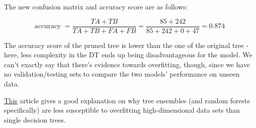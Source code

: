 \documentclass[12pt]{article}
\begin{document}
\begin{enumerate}[leftmargin=\labelsep]
        \begin{figure}[H]
          \centering
          
        \end{figure}

        The new confusion matrix and accuracy score are as follows:

        \begin{figure}[H]
          \centering
          
        \end{figure}

        \begin{equation*}
          \operatorname{accuracy} = \frac{TA + TB}{TA + TB + FA + FB} = \frac{85 + 242}{85 + 242 + 0 + 47} = 0.874
        \end{equation*}

        The accuracy score of the pruned tree is lower than the one of the original
        tree - here, less complexity in the DT ends up being disadvantageous for the
        model. We can't exactly say that there's evidence towards overfitting, though,
        since we have no validation/testing sets to compare the two models' performance
        on unseen data.

        \href{https://towardsdatascience.com/basic-ensemble-learning-random-forest-adaboost-gradient-boosting-step-by-step-explained-95d49d1e2725}{This}
        article gives a good explanation on why tree ensembles (and random forests
        specifically) are less susceptible to overfitting high-dimensional data sets
        than single decision trees.

\end{enumerate}
\end{document}
